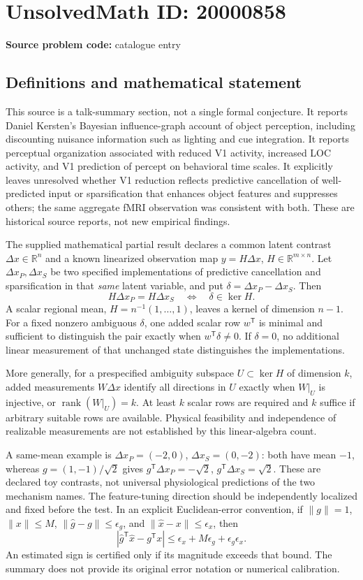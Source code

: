 \documentclass[11pt]{article}
\newcommand{\R}{\mathbb{R}}
\begin{document}
\section*{UnsolvedMath ID: 20000858}
\textbf{Source problem code:} catalogue entry
\subsection{Definitions and mathematical statement}
This source is a talk-summary section, not a single formal conjecture. It reports Daniel Kersten's Bayesian influence-graph account of object perception, including discounting nuisance information such as lighting and cue integration. It reports perceptual organization associated with reduced V1 activity, increased LOC activity, and V1 prediction of percept on behavioral time scales. It explicitly leaves unresolved whether V1 reduction reflects predictive cancellation of well-predicted input or sparsification that enhances object features and suppresses others; the same aggregate fMRI observation was consistent with both. These are historical source reports, not new empirical findings.

The supplied mathematical partial result declares a common latent contrast \(\Delta x\in\R^n\) and a known linearized observation map \(y=H\Delta x\), \(H\in\R^{m\times n}\). Let \(\Delta x_P,\Delta x_S\) be two specified implementations of predictive cancellation and sparsification in that \emph{same} latent variable, and put \(\delta=\Delta x_P-\Delta x_S\). Then
\[
 H\Delta x_P=H\Delta x_S\quad\Longleftrightarrow\quad\delta\in\ker H.
\]
A scalar regional mean, \(H=n^{-1}(1,\ldots,1)\), leaves a kernel of dimension \(n-1\). For a fixed nonzero ambiguous \(\delta\), one added scalar row \(w^{\mathsf T}\) is minimal and sufficient to distinguish the pair exactly when \(w^{\mathsf T}\delta\neq0\). If \(\delta=0\), no additional linear measurement of that unchanged state distinguishes the implementations.

More generally, for a prespecified ambiguity subspace \(U\subset\ker H\) of dimension \(k\), added measurements \(W\Delta x\) identify all directions in \(U\) exactly when \(W|_U\) is injective, or \(\operatorname{rank}(W|_U)=k\). At least \(k\) scalar rows are required and \(k\) suffice if arbitrary suitable rows are available. Physical feasibility and independence of realizable measurements are not established by this linear-algebra count.

A same-mean example is \(\Delta x_P=(-2,0)\), \(\Delta x_S=(0,-2)\): both have mean \(-1\), whereas \(g=(1,-1)/\sqrt2\) gives \(g^{\mathsf T}\Delta x_P=-\sqrt2\), \(g^{\mathsf T}\Delta x_S=\sqrt2\). These are declared toy contrasts, not universal physiological predictions of the two mechanism names. The feature-tuning direction should be independently localized and fixed before the test. In an explicit Euclidean-error convention, if \(\|g\|=1\), \(\|x\|\leq M\), \(\|\widehat g-g\|\leq\epsilon_g\), and \(\|\widehat x-x\|\leq\epsilon_x\), then
\[
 |\widehat g^{\mathsf T}\widehat x-g^{\mathsf T}x|
 \leq\epsilon_x+M\epsilon_g+\epsilon_g\epsilon_x.
\]
An estimated sign is certified only if its magnitude exceeds that bound. The summary does not provide its original error notation or numerical calibration.
\end{document}
